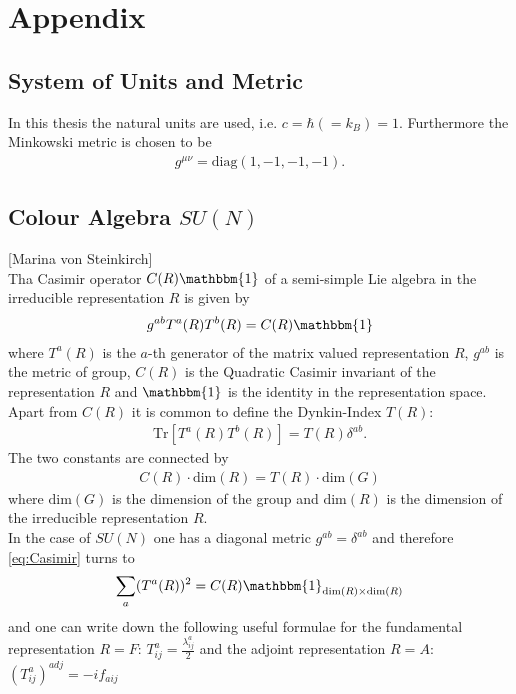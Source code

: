 \section{Appendix}


\subsection{System of Units and Metric}
In this thesis the natural units are used, i.e. $c= \hbar (= k_B) = 1$. Furthermore the Minkowski metric is chosen to be
\begin{align}
g^{\mu\nu} = \mathrm{diag}(1, -1, -1, -1).
\end{align}


\subsection{Colour Algebra $SU(N)$}
[Marina von Steinkirch]\\
Tha Casimir operator $C(R)\mathbbm{1}$ of a semi-simple Lie algebra in the irreducible representation $R$ is given by
\begin{align}
g^{ab} T^a(R)T^b(R) = C(R)\mathbbm{1} \label{eq:Casimir}
\end{align}
where $T^a(R)$ is the $a$-th generator of the matrix valued representation $R$, $g^{ab}$ is the metric of group, $C(R)$ is the Quadratic Casimir invariant of the representation $R$ and $\mathbbm{1}$ is the identity in the representation space.\\
Apart from $C(R)$ it is common to define the Dynkin-Index $T(R)$:
\begin{align}
\mathrm{Tr}\left[T^a(R)T^b(R)\right] = T(R)\delta^{ab}.
\end{align}
The two constants are connected by
\begin{align}
C(R) \cdot \mathrm{dim}(R) = T(R) \cdot \mathrm{dim}(G)
\end{align}
where $\mathrm{dim}(G)$ is the dimension of the group and $\mathrm{dim}(R)$ is the dimension of the irreducible representation $R$.\\
In the case of $SU(N)$ one has a diagonal metric $g^{ab} = \delta^{ab}$ and therefore \ref{eq:Casimir} turns to
\begin{align}
\sum_a (T^a(R))^2 = C(R)\mathbbm{1}_{\mathrm{dim}(R) \times \mathrm{dim}(R)}
\end{align}
and one can write down the following useful formulae for the fundamental representation $R=F$: $T^a_{ij} = \frac{\lambda^a_{ij}}{2}$ and the adjoint representation $R=A$: $(T^a_{ij})^{adj} = -if_{aij}$
